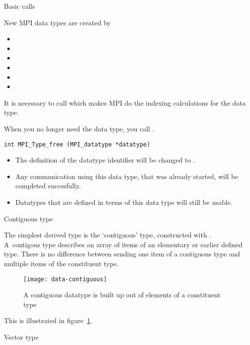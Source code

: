  {Basic calls}
\label{sec:data-commit}

New MPI data types are created by
\begin{itemize}
\item {}
\item {}
\item {}
\item {}
\item {}
\item {}
\end{itemize}
It is necessary to call  which makes MPI
do the indexing calculations for the data type.
%

When you no longer
need the data type, you call .
\begin{verbatim}
int MPI_Type_free (MPI_datatype *datatype)
\end{verbatim}
\begin{itemize}
\item The definition of the datatype identifier will be changed to
  .
\item Any communication using this data type, that was already
  started, will be completed succesfully.
\item Datatypes that are defined in terms of this data type will still
  be usable.
\end{itemize}

 {Contiguous type}
\label{sec:data:contiguous}

The simplest derived type is the `contiguous' type,
constructed with .
%
%
A~contigous type describes an array of items
of an elementary or earlier defined type. There is no difference between sending
one item of a contiguous type and multiple items of the constituent type.
\begin{figure}[ht]
  \texttt{[image: data-contiguous]}
  \caption{A contiguous datatype is built up out of elements of a constituent type}
  \label{fig:data-contiguous}
\end{figure}
This is illustrated in figure~\ref{fig:data-contiguous}.


 {Vector type}
\label{sec:data:vector}

